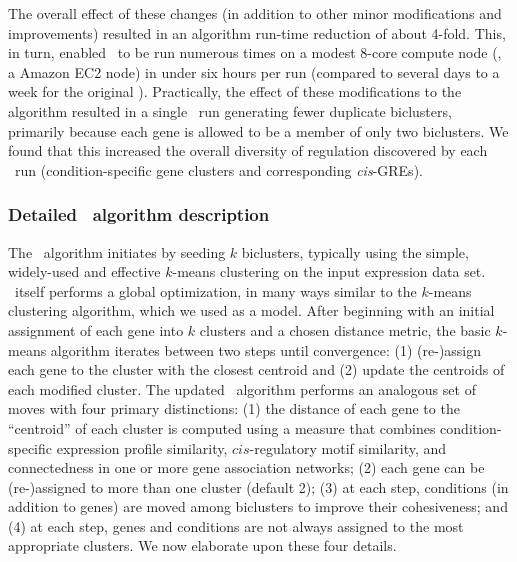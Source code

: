 The overall effect of these changes (in addition to other minor
modifications and improvements) resulted in an algorithm run-time
reduction of about 4-fold. This, in turn, enabled \cm\ to be run
numerous times on a modest 8-core compute node (\eg, a
 Amazon EC2 node) in under six hours per run
(compared to several days to a week for the original
\cm). Practically, the effect of these modifications to the
algorithm resulted in a single \cm\ run generating fewer duplicate
biclusters, primarily because each gene is allowed to be a member of
only two biclusters. We found that this increased the overall
diversity of regulation discovered by each \cm\ run
(condition-specific gene clusters and corresponding
\textit{cis}-GREs).

\subsubsection{Detailed \cm\ algorithm description}

The \cm\ algorithm initiates by seeding $k$ biclusters, typically using
the simple, widely-used and effective $k$-means clustering on the
input expression data set. \cm\ itself performs a global optimization,
in many ways similar to the $k$-means clustering algorithm, which we
used as a model. After beginning with an initial assignment of each
gene into $k$ clusters and a chosen distance metric, the basic
$k$-means algorithm iterates between two steps until convergence: (1)
(re-)assign each gene to the cluster with the closest centroid and (2)
update the centroids of each modified cluster. The updated \cm\ 
algorithm performs an analogous set of moves with four primary
distinctions: (1) the distance of each gene to the ``centroid'' of
each cluster is computed using a measure that combines
condition-specific expression profile similarity, $cis$-regulatory
motif similarity, and connectedness in one or more gene association
networks; (2) each gene can be (re-)assigned to more than one cluster
(default 2); (3) at each step, conditions (in addition to genes) are
moved among biclusters to improve their cohesiveness; and (4) at each
step, genes and conditions are not always assigned to the most
appropriate clusters. We now elaborate upon these four details.

